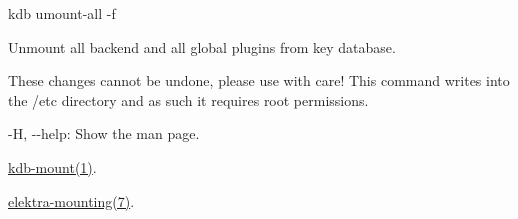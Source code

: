 {\ttfamily kdb umount-\/all -\/f}

Unmount all backend and all global plugins from key database.

These changes cannot be undone, please use with care! This command writes into the {\ttfamily /etc} directory and as such it requires root permissions.


\begin{DoxyItemize}
\item {\ttfamily -\/H}, {\ttfamily -\/-\/help}\+: Show the man page.
\end{DoxyItemize}


\begin{DoxyItemize}
\item \hyperlink{doc_help_kdb-mount_md}{kdb-\/mount(1)}.
\item \hyperlink{doc_help_elektra-mounting_md}{elektra-\/mounting(7)}. 
\end{DoxyItemize}
